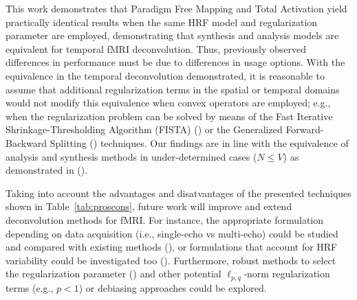This work demonstrates that Paradigm Free Mapping and Total Activation yield practically identical results when the same HRF model and regularization parameter are employed, demonstrating that synthesis and analysis models are equivalent for temporal fMRI deconvolution. Thus, previously observed differences in performance must be due to differences in usage options. With the equivalence in the temporal deconvolution demonstrated, it is reasonable to assume that additional regularization terms in the spatial or temporal domains would not modify this equivalence when convex operators are employed; e.g., when the regularization problem can be solved by means of the Fast Iterative Shrinkage-Thresholding Algorithm (FISTA) (\citealt{beck2009FastIterativeShrinkagethresholding}) or the Generalized Forward-Backward Splitting (\citealt{raguet2013GeneralizedForwardBackwardSplittinga}) techniques. Our findings are in line with the equivalence of analysis and synthesis methods in under-determined cases (\(N \leq V\)) as demonstrated in (\citealt{elad2007AnalysisSynthesisSignal}).

Taking into account the advantages and disatvantages of the presented techniques shown in Table~\ref{tab:proscons}, future work will improve and extend deconvolution methods for fMRI. For instance, the appropriate formulation depending on data acquisition (i.e., single-echo vs multi-echo) could be studied and compared with existing methods (\citealt{caballero-gaudes2019DeconvolutionAlgorithmMultiecho}), or formulations that account for HRF variability could be investigated too (\citealt{badillo2013GrouplevelImpactsBetweensubject,gaudes2012StructuredSparseDeconvolution,farouj2019BoldSignalDeconvolution}). Furthermore, robust methods to select the regularization parameter (\citealt{urunuela2020StabilityBasedSparseParadigm,meinshausen2009StabilitySelection}) and other potential \(\ell_{p,q}\)-norm regularization terms (e.g., \(p < 1\)) or debiasing approaches could be explored.
